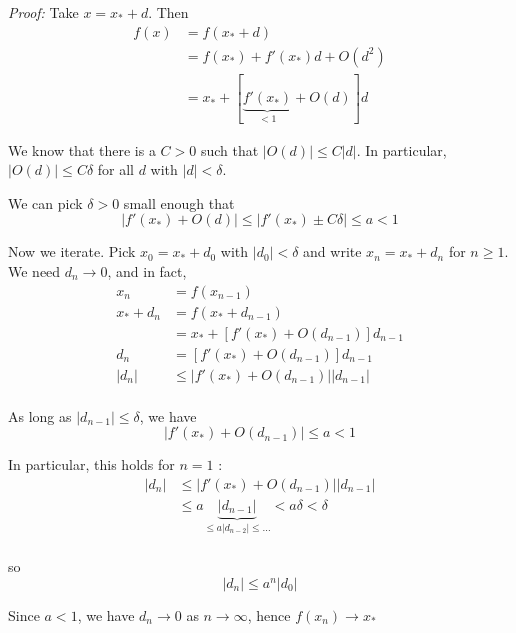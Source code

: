 \documentclass[12pt]{report}
\newcommand{\abs}[1]{\left\vert #1 \right\vert}
\newenvironment{proof}[1][blue]{
\begin{tcolorbox}[
    parbox=false,
    colback=#1!5!white,
    colframe=#1!75!black,
    breakable
]}
{\end{tcolorbox}}
\begin{document}
\begin{proof}
    \emph{Proof:} Take $x = x_* + d$. Then
    \begin{align*}
        f(x) & = f(x_* + d)                                \\
             & = f(x_*) + f'(x_*)d + O(d^2)                \\
             & = x_* + [\underbrace{f'(x_*)}_{<1} + O(d)]d
    \end{align*}

    We know that there is a $C > 0$ such that $\abs{O(d)} \leq C\abs{d}$. In particular, $\abs{O(d)} \leq C \delta$ for all $d$ with $\abs{d} < \delta$.

    We can pick $\delta > 0$ small enough that
    \[\abs{f'(x_*) + O(d)} \leq \abs{f'(x_*) \pm C\delta} \leq a < 1\]

    Now we iterate. Pick $x_0 = x_* + d_0$ with $\abs{d_0} < \delta$ and write $x_n = x_* + d_n$ for $n \geq 1$. We need $d_n \to 0$, and in fact,
    \begin{align*}
        x_n       & = f(x_{n-1})                                 \\
        x_* + d_n & = f(x_* + d_{n-1})                           \\
                  & = x_* + [f'(x_*) + O(d_{n-1})]d_{n-1}        \\
        d_n       & = [f'(x_*) + O(d_{n-1})]d_{n-1}              \\
        \abs{d_n} & \leq \abs{f'(x_*) + O(d_{n-1})}\abs{d_{n-1}} \\
    \end{align*}

    As long as $\abs{d_{n-1}} \leq \delta$, we have
    \[\abs{f'(x_*) + O(d_{n-1})} \leq a < 1\]

    In particular, this holds for $n = 1$ :
    \begin{align*}
        \abs{d_n} & \leq \abs{f'(x_*) + O(d_{n-1})}\abs{d_{n-1}}                                            \\
                  & \leq a \underbrace{\abs{d_{n-1}}}_{\leq a \abs{d_{n-2}} \leq \dots} < a \delta < \delta \\
    \end{align*}

    so
    \[\abs{d_n} \leq a^n \abs{d_0}\]

    Since $a < 1$, we have $d_n \to 0$ as $n \to \infty$, hence $f(x_n) \to x_*$
\end{proof}
\end{document}
